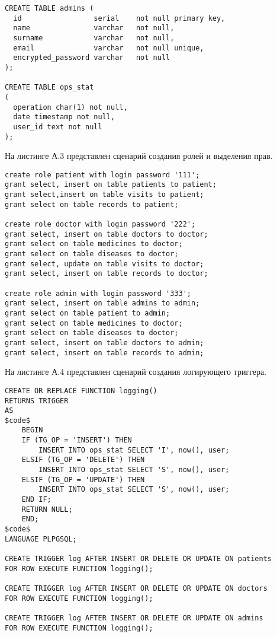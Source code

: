 \begin{appendices}
\begin{lstlisting}[caption={Сценарий создания базы данных(продолжение)}]
CREATE TABLE admins (
  id                 serial    not null primary key,
  name               varchar   not null,
  surname            varchar   not null,
  email              varchar   not null unique,
  encrypted_password varchar   not null
);

CREATE TABLE ops_stat
(
  operation char(1) not null,
  date timestamp not null,
  user_id text not null
);
\end{lstlisting}
\clearpage
На листинге А.3 представлен сценарий создания ролей и выделения прав.

\begin{lstlisting}[caption={Создание ролей и выделение прав}]
create role patient with login password '111';
grant select, insert on table patients to patient;
grant select,insert on table visits to patient;
grant select on table records to patient;

create role doctor with login password '222';
grant select, insert on table doctors to doctor;
grant select on table medicines to doctor;
grant select on table diseases to doctor;
grant select, update on table visits to doctor;
grant select, insert on table records to doctor;

create role admin with login password '333';
grant select, insert on table admins to admin;
grant select on table patient to admin;
grant select on table medicines to doctor;
grant select on table diseases to doctor;
grant select, insert on table doctors to admin;
grant select, insert on table records to admin;
\end{lstlisting}

\clearpage
На листинге А.4 представлен сценарий создания логирующего триггера.

\begin{lstlisting}[caption={Сценарий создания логирующего триггера}]
CREATE OR REPLACE FUNCTION logging()
RETURNS TRIGGER
AS
$code$
	BEGIN
	IF (TG_OP = 'INSERT') THEN
		INSERT INTO ops_stat SELECT 'I', now(), user;
	ELSIF (TG_OP = 'DELETE') THEN
		INSERT INTO ops_stat SELECT 'S', now(), user;
	ELSIF (TG_OP = 'UPDATE') THEN
		INSERT INTO ops_stat SELECT 'S', now(), user;
	END IF;
	RETURN NULL;
	END;
$code$
LANGUAGE PLPGSQL;

CREATE TRIGGER log AFTER INSERT OR DELETE OR UPDATE ON patients
FOR ROW EXECUTE FUNCTION logging();

CREATE TRIGGER log AFTER INSERT OR DELETE OR UPDATE ON doctors
FOR ROW EXECUTE FUNCTION logging();

CREATE TRIGGER log AFTER INSERT OR DELETE OR UPDATE ON admins
FOR ROW EXECUTE FUNCTION logging();


\end{lstlisting}
\end{appendices}
